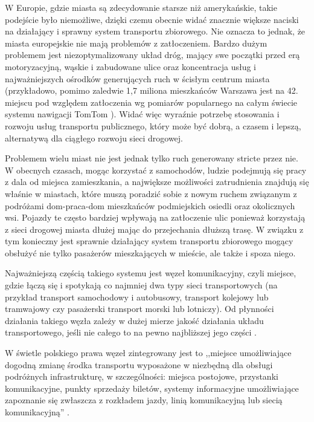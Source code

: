 \documentclass[twoside,12pt]{article}
\begin{document}
	
	W Europie, gdzie miasta są zdecydowanie starsze niż amerykańskie, takie podejście było niemożliwe, dzięki czemu obecnie widać znacznie większe naciski na działający i sprawny system transportu zbiorowego. Nie oznacza to jednak, że miasta europejskie nie mają problemów z zatłoczeniem. Bardzo dużym problemem jest niezoptymalizowany układ dróg, mający swe początki przed erą motoryzacyjną, wąskie i zabudowane ulice oraz koncentracja usług i najważniejszych ośrodków generujących ruch w ścisłym centrum miasta (przykładowo, pomimo zaledwie 1,7 miliona mieszkańców Warszawa jest na 42. miejscu pod względem zatłoczenia wg pomiarów popularnego na całym świecie systemu nawigacji TomTom \cite{tomtom}). Widać więc wyraźnie potrzebę stosowania i rozwoju usług transportu publicznego, który może być dobrą, a czasem i lepszą, alternatywą dla ciągłego rozwoju sieci drogowej. 
	
	Problemem wielu miast nie jest jednak tylko ruch generowany stricte przez nie. W obecnych czasach, mogąc korzystać z samochodów, ludzie podejmują się pracy z dala od miejsca zamieszkania, a największe możliwości zatrudnienia znajdują się właśnie w miastach, które muszą poradzić sobie z nowym ruchem związanym z podróżami dom-praca-dom mieszkańców podmiejskich osiedli oraz okolicznych wsi. Pojazdy te często bardziej wpływają na zatłoczenie ulic ponieważ korzystają z sieci drogowej miasta dłużej mając do przejechania dłuższą trasę. W związku z tym konieczny jest sprawnie działający system transportu zbiorowego mogący obsłużyć nie tylko pasażerów mieszkających w mieście, ale także i spoza niego. 
		
	Najważniejszą częścią takiego systemu jest węzeł komunikacyjny, czyli miejsce, gdzie łączą się i spotykają co najmniej dwa typy sieci transportowych (na przykład transport samochodowy i autobusowy, transport kolejowy lub tramwajowy czy pasażerski transport morski lub lotniczy). Od płynności działania takiego węzła zależy w dużej mierze jakość działania układu transportowego, jeśli nie całego to na pewno najbliższej jego części \cite{urbanistyka}. 
	
	W świetle polskiego prawa węzeł zintegrowany jest to ,,miejsce umożliwiające dogodną zmianę środka transportu wyposażone w niezbędną dla obsługi podróżnych infrastrukturę, w szczególności: miejsca postojowe, przystanki komunikacyjne, punkty sprzedaży biletów, systemy informacyjne umożliwiające zapoznanie się zwłaszcza z rozkładem jazdy, linią komunikacyjną lub siecią komunikacyjną'' \cite{ustawa_transport}.
	
\end{document}
